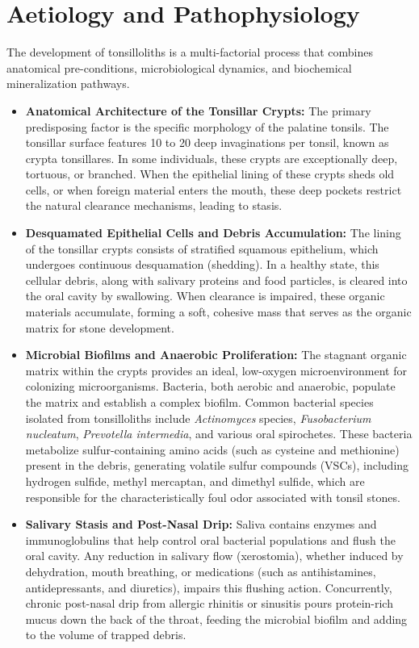 \section*{Aetiology and Pathophysiology}
The development of tonsilloliths is a multi-factorial process that combines anatomical pre-conditions, microbiological dynamics, and biochemical mineralization pathways.
\begin{itemize}
    \item \textbf{Anatomical Architecture of the Tonsillar Crypts:} The primary predisposing factor is the specific morphology of the palatine tonsils. The tonsillar surface features 10 to 20 deep invaginations per tonsil, known as crypta tonsillares. In some individuals, these crypts are exceptionally deep, tortuous, or branched. When the epithelial lining of these crypts sheds old cells, or when foreign material enters the mouth, these deep pockets restrict the natural clearance mechanisms, leading to stasis.
    \item \textbf{Desquamated Epithelial Cells and Debris Accumulation:} The lining of the tonsillar crypts consists of stratified squamous epithelium, which undergoes continuous desquamation (shedding). In a healthy state, this cellular debris, along with salivary proteins and food particles, is cleared into the oral cavity by swallowing. When clearance is impaired, these organic materials accumulate, forming a soft, cohesive mass that serves as the organic matrix for stone development.
    \item \textbf{Microbial Biofilms and Anaerobic Proliferation:} The stagnant organic matrix within the crypts provides an ideal, low-oxygen microenvironment for colonizing microorganisms. Bacteria, both aerobic and anaerobic, populate the matrix and establish a complex biofilm. Common bacterial species isolated from tonsilloliths include \textit{Actinomyces} species, \textit{Fusobacterium nucleatum}, \textit{Prevotella intermedia}, and various oral spirochetes. These bacteria metabolize sulfur-containing amino acids (such as cysteine and methionine) present in the debris, generating volatile sulfur compounds (VSCs), including hydrogen sulfide, methyl mercaptan, and dimethyl sulfide, which are responsible for the characteristically foul odor associated with tonsil stones.
    \item \textbf{Salivary Stasis and Post-Nasal Drip:} Saliva contains enzymes and immunoglobulins that help control oral bacterial populations and flush the oral cavity. Any reduction in salivary flow (xerostomia), whether induced by dehydration, mouth breathing, or medications (such as antihistamines, antidepressants, and diuretics), impairs this flushing action. Concurrently, chronic post-nasal drip from allergic rhinitis or sinusitis pours protein-rich mucus down the back of the throat, feeding the microbial biofilm and adding to the volume of trapped debris.

\end{itemize}
